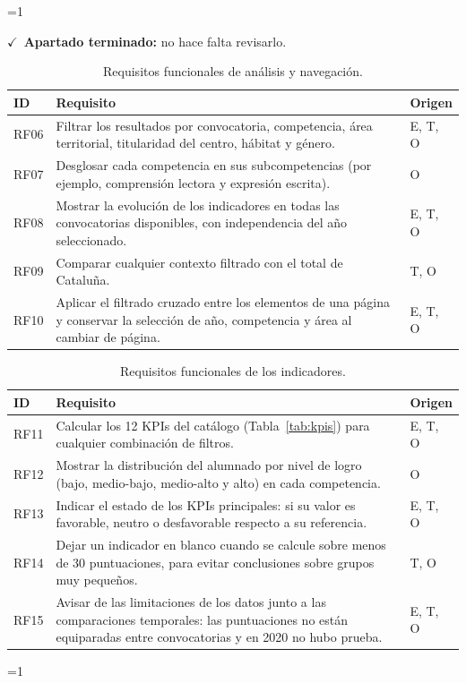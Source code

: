 \documentclass[12pt, a4paper, oneside]{report}
\newcommand{\mostrarterminados}{1}
\newenvironment{revisado}
  {\ifnum\mostrarterminados=1\relax\begin{cajarevisada}\noindent\colorbox{verdeterminado}{\parbox{\dimexpr\linewidth-2\fboxsep\relax}{\small$\checkmark$\ \textbf{Apartado terminado:} no hace falta revisarlo.}}\par\medskip\fi}
  {\ifnum\mostrarterminados=1\relax\end{cajarevisada}\fi}
\begin{document}
\begin{revisado}
\begin{table}[H]
\centering
\small
\renewcommand{\arraystretch}{1.1}
\begin{tabularx}{\textwidth}{@{} p{1.2cm} X p{2.2cm} @{}}
\toprule
\textbf{ID} & \textbf{Requisito} & \textbf{Origen} \\ \midrule
RF06 & Filtrar los resultados por convocatoria, competencia, área territorial, titularidad del centro, hábitat y género. & E, T, O \\ \addlinespace
RF07 & Desglosar cada competencia en sus subcompetencias (por ejemplo, comprensión lectora y expresión escrita). & O \\ \addlinespace
RF08 & Mostrar la evolución de los indicadores en todas las convocatorias disponibles, con independencia del año seleccionado. & E, T, O \\ \addlinespace
RF09 & Comparar cualquier contexto filtrado con el total de Cataluña. & T, O \\ \addlinespace
RF10 & Aplicar el filtrado cruzado entre los elementos de una página y conservar la selección de año, competencia y área al cambiar de página. & E, T, O \\ \bottomrule
\end{tabularx}
\caption{Requisitos funcionales de análisis y navegación.}
\label{tab:rf_analisis}
\end{table}

\begin{table}[H]
\centering
\small
\renewcommand{\arraystretch}{1.1}
\begin{tabularx}{\textwidth}{@{} p{1.2cm} X p{2.2cm} @{}}
\toprule
\textbf{ID} & \textbf{Requisito} & \textbf{Origen} \\ \midrule
RF11 & Calcular los 12 KPIs del catálogo (Tabla~\ref{tab:kpis}) para cualquier combinación de filtros. & E, T, O \\ \addlinespace
RF12 & Mostrar la distribución del alumnado por nivel de logro (bajo, medio-bajo, medio-alto y alto) en cada competencia. & O \\ \addlinespace
RF13 & Indicar el estado de los KPIs principales: si su valor es favorable, neutro o desfavorable respecto a su referencia. & E, T, O \\ \addlinespace
RF14 & Dejar un indicador en blanco cuando se calcule sobre menos de 30 puntuaciones, para evitar conclusiones sobre grupos muy pequeños. & T, O \\ \addlinespace
RF15 & Avisar de las limitaciones de los datos junto a las comparaciones temporales: las puntuaciones no están equiparadas entre convocatorias y en 2020 no hubo prueba. & E, T, O \\ \bottomrule
\end{tabularx}
\caption{Requisitos funcionales de los indicadores.}
\label{tab:rf_kpis}
\end{table}


\end{revisado}
\end{document}
